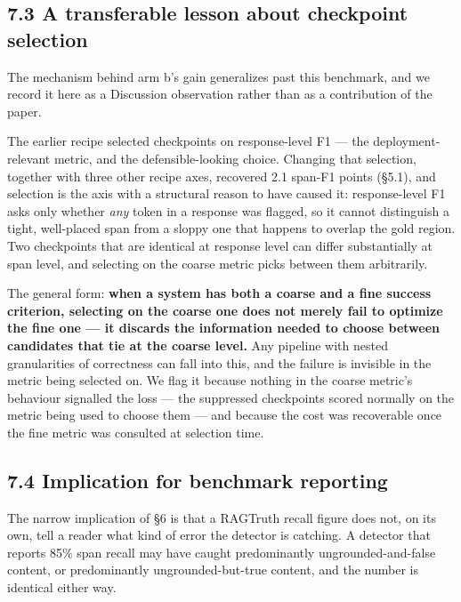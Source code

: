 \documentclass[11pt]{article}
\begin{document}
\subsection{7.3 A transferable lesson about checkpoint selection}\label{a-transferable-lesson-about-checkpoint-selection}

The mechanism behind arm b's gain generalizes past this benchmark, and we record it here as
a Discussion observation rather than as a contribution of the paper.

The earlier recipe selected checkpoints on response-level F1 --- the deployment-relevant
metric, and the defensible-looking choice. Changing that selection, together with three
other recipe axes, recovered 2.1 span-F1 points (§5.1), and selection is the axis with a
structural reason to have caused it: response-level F1 asks only whether
\emph{any} token in a response was flagged, so it cannot distinguish a tight, well-placed span
from a sloppy one that happens to overlap the gold region. Two checkpoints that are
identical at response level can differ substantially at span level, and selecting on the
coarse metric picks between them arbitrarily.

The general form: \textbf{when a system has both a coarse and a fine success criterion, selecting
on the coarse one does not merely fail to optimize the fine one --- it discards the
information needed to choose between candidates that tie at the coarse level.} Any pipeline
with nested granularities of correctness can fall into this, and the failure is invisible in
the metric being selected on. We flag it because nothing in the coarse metric's behaviour
signalled the loss --- the suppressed checkpoints scored normally on the metric being used to
choose them --- and because the cost was recoverable once the fine metric was consulted at
selection time.

\subsection{7.4 Implication for benchmark reporting}\label{implication-for-benchmark-reporting}

The narrow implication of §6 is that a RAGTruth recall figure does not, on its own, tell a
reader what kind of error the detector is catching. A detector that reports 85\% span recall
may have caught predominantly ungrounded-and-false content, or predominantly
ungrounded-but-true content, and the number is identical either way.
\end{document}
